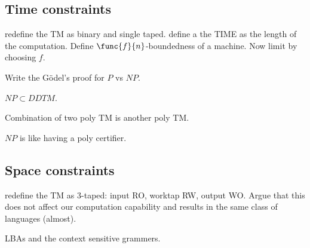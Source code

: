 \subsection{Time constraints}
redefine the TM as binary and single taped. define a the TIME as the length of the computation. Define \(\func{f}{n}\)-boundedness of a machine. Now limit by choosing \(f\). 

Write the G\"{o}del's proof for \(P\) vs \(NP\).

\(NP \subset DDTM\).

Combination of two poly TM is another poly TM.

\(NP\) is like having a poly certifier.

\subsection{Space constraints}
redefine the TM as 3-taped: input RO, worktap RW, output WO. Argue that this does not affect our computation capability and results in the same class of languages (almost).

LBAs and the context sensitive grammers.

